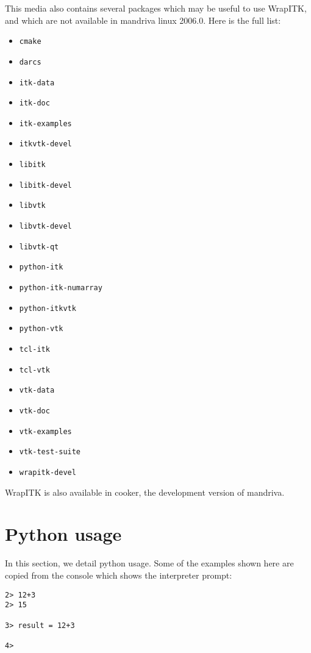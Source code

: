 \documentclass{InsightArticle}
\begin{document}
This media also contains several packages which may be useful to use WrapITK,
and which are not available in mandriva linux 2006.0. Here is the full list:
\begin{itemize}
  \item \verb$cmake$
  \item \verb$darcs$
  \item \verb$itk-data$
  \item \verb$itk-doc$
  \item \verb$itk-examples$
  \item \verb$itkvtk-devel$
  \item \verb$libitk$
  \item \verb$libitk-devel$
  \item \verb$libvtk$
  \item \verb$libvtk-devel$
  \item \verb$libvtk-qt$
  \item \verb$python-itk$
  \item \verb$python-itk-numarray$
  \item \verb$python-itkvtk$
  \item \verb$python-vtk$
  \item \verb$tcl-itk$
  \item \verb$tcl-vtk$
  \item \verb$vtk-data$
  \item \verb$vtk-doc$
  \item \verb$vtk-examples$
  \item \verb$vtk-test-suite$
  \item \verb$wrapitk-devel$
\end{itemize}

WrapITK is also available in cooker, the development version of mandriva.


  \section{Python usage}

In this section, we detail python usage. Some of the examples shown here are copied
from the console which shows the interpreter prompt:

\begin{verbatim}
2> 12+3
2> 15

3> result = 12+3

4>
\end{verbatim}
\end{document}
